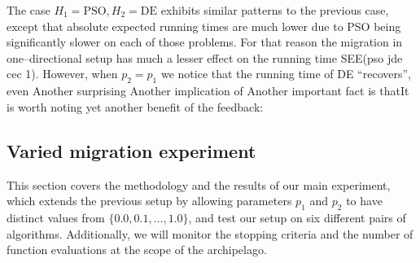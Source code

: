 \documentclass{sig-alternate}
\begin{document}
The case $H_1 = \mbox{PSO}, H_2=\mbox{DE}$ exhibits similar patterns to the previous case, except that absolute expected running times are much lower due to PSO being significantly slower on each of those problems.
For that reason the migration in one--directional setup has much a lesser effect on the running time SEE(pso jde cec 1).
However, when $p_2 = p_1$ we notice that the running time of DE ``recovers'', even
Another surprising 
Another implication of 
Another important fact is thatIt is worth noting yet another benefit of the feedback: 


\subsection{Varied migration experiment}

This section covers the methodology and the results of our main experiment, which extends the previous setup by allowing parameters $p_1$ and $p_2$ to have distinct values from $\{0.0, 0.1, \ldots, 1.0\}$, and test our setup on six different pairs of algorithms.
Additionally, we will monitor the stopping criteria and the number of function evaluations at the scope of the archipelago.
\end{document}
